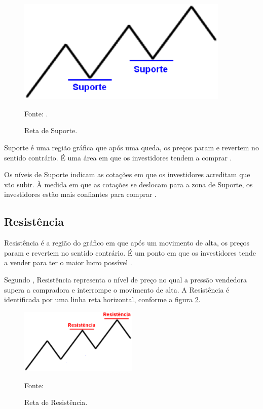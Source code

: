 \begin{figure}
\centering
\includegraphics[width=0.9\textwidth]{figuras/retaSuporte}
\caption{Reta de Suporte.}{Fonte: .}
\label{retaSuporte}
\end{figure}

Suporte é uma região gráfica que após uma queda, os preços param e revertem no sentido contrário. É uma área em que os investidores tendem a comprar \cite[p~97]{debastini2008}.

Os níveis de Suporte indicam as cotações em que os investidores acreditam que vão subir. À medida em que as cotações se deslocam para a zona de Suporte, os investidores estão mais confiantes para comprar \cite{collins2012}.

\subsection{Resistência}

Resistência é a região do gráfico em que após um movimento de alta, os preços param e revertem no sentido contrário. É um ponto em que os investidores tende a vender para ter o maior lucro possível \cite[p.~98]{debastini2008}.

Segundo , Resistência representa o nível de preço no qual a pressão vendedora supera a compradora e interrompe o movimento de alta. A Resistência é identificada por uma linha reta horizontal, conforme a figura \ref{retaResistencia}.

\begin{figure}[H]
\centering
\includegraphics[width=0.5\textwidth]{figuras/retaResistencia}
\caption{Reta de Resistência.}{Fonte: } 
\label{retaResistencia}
\end{figure}

